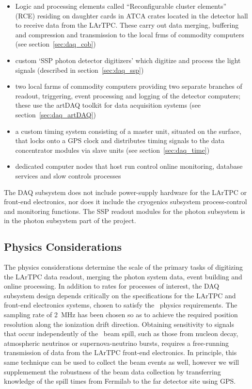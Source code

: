 \begin{itemize}
  \item Logic and processing elements called ``Reconfigurable cluster
    elements'' (RCE) residing on daughter cards in ATCA crates located
    in the detector hall to receive data from the LArTPC.  These carry
    out data merging, buffering and compression and transmission to the
    local frms of commodity computers (see section~\ref{sec:daq_cob})
  \item custom `SSP photon detector digitizers' which digitize and
    process the light signals (described in section~\ref{sec:daq_ssp}) 
  \item two local farms of commodity computers providing two separate
    branches of readout, triggering, event processing and logging of the
    detector computers; these use the artDAQ toolkit for data
    acquisition systems (see section~\ref{sec:daq_artDAQ})
  \item a custom timing system consisting of a master unit, situated
    on the surface, that locks onto a GPS clock and distributes timing
    signals to the data concentrator modules via slave units (see
    section~\ref{sec:daq_time})
  \item dedicated computer nodes that host run control online
    monitoring, database services and slow controls processes
\end{itemize}
%
The DAQ subsystem does not include power-supply hardware for the
LArTPC or front-end electronics, nor does it include the cryogenics
subsystem process-control and monitoring functions.  The SSP readout
modules for the photon subsystem is in the photon subsystem part of
the project.

\subsection{Physics Considerations}

The physics considerations determine the scale of the primary tasks of
digitizing the LArTPC data readout, merging the photon system data,
event building and online processing.  In addition to rates for
processes of interest, the DAQ subsystem design depends critically on
the specifications for the LArTPC and front-end electronics systems,
chosen to satisfy the \LBNE\ physics requirements.  The sampling rate
of 2~MHz has been chosen so as to achieve the required position
resolution along the ionization drift direction. Obtaining sensitivity
to signals that occur independently of the \LBNE\ beam spill, such as
those from nucleon decay, atmospheric neutrinos or supernova-neutrino
bursts, requires a free-running transmission of data from the LArTPC
front-end electronics.  In principle, this same technique can be used
to collect the beam events as well, however we will supplemement the
robustness of the beam data collection by transferring knowledge of
the spill times from Fermilab to the far detector site using GPS.

